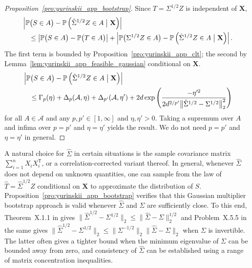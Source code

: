 \documentclass[11pt,lof]{puthesis}
\renewcommand{\P}{\ensuremath{\mathbb{P}}}
\newcommand{\bX}{\ensuremath{\mathbf{X}}}
\newcommand{\cA}{\ensuremath{\mathcal{A}}}
\newcommand{\T}{\ensuremath{\mathsf{T}}}
\theoremstyle{break}
\theoremstyle{proof}
\newtheorem{proof}{Proof}
\begin{document}
\begin{proof}[Proposition~\ref{pro:yurinskii_app_bootstrap}]

  Since $T = \Sigma^{1/2} Z$ is independent of $\bX$,
  \begin{align*}
    &\left|
    \P\big(S \in A\big)
    - \P\left(\hat \Sigma^{1/2} Z \in A \bigm| \bX\right)
    \right| \\
    &\quad\leq
    \left|
    \P\big(S \in A\big)
    - \P\big(T \in A\big)
    \right|
    +\left|
    \P\big(\Sigma^{1/2} Z \in A\big)
    - \P\left(\hat \Sigma^{1/2} Z \in A \bigm| \bX\right)
    \right|.
  \end{align*}
  The first term is bounded by Proposition~\ref{pro:yurinskii_app_clt};
  the second by Lemma~\ref{lem:yurinskii_app_feasible_gaussian}
  conditional on $\bX$.
  \begin{align*}
    &\left|
    \P\big(S \in A\big)
    - \P\left(\hat \Sigma^{1/2} Z \in A \bigm| \bX\right)
    \right| \\
    &\quad\leq
    \Gamma_p(\eta) + \Delta_p(\cA, \eta)
    + \Delta_{p'}(\cA, \eta')
    + 2 d \exp \left( \frac{-\eta'^2}
      {2 d^{2/p'} \big\|\hat\Sigma^{1/2} - \Sigma^{1/2}\big\|_2^2}
    \right)
  \end{align*}
  for all $A \in \cA$
  and any $p, p' \in [1, \infty]$ and $\eta, \eta' > 0$.
  Taking a supremum over $A$ and infima over
  $p = p'$ and $\eta = \eta'$ yields the result.
  We do not need
  $p = p'$ and $\eta = \eta'$ in general.
\end{proof}

A natural choice for $\hat\Sigma$ in certain situations is the sample
covariance matrix $\sum_{i=1}^n X_i X_i^\T$, or a correlation-corrected variant
thereof. In general, whenever $\hat \Sigma$ does not depend on unknown
quantities, one can sample from the law of $\hat T = \hat\Sigma^{1/2} Z$
conditional on $\bX$ to approximate the distribution of $S$.
Proposition~\ref{pro:yurinskii_app_bootstrap} verifies that this Gaussian
multiplier bootstrap approach is valid whenever $\hat\Sigma$ and $\Sigma$ are
sufficiently close. To this end, Theorem~X.1.1 in \citet{bhatia1997matrix} gives
$\big\|\hat\Sigma^{1/2} - \Sigma^{1/2}\big\|_2
\leq \big\|\hat\Sigma - \Sigma\big\|_2^{1/2}$
and Problem~X.5.5 in the same gives
$\big\|\hat\Sigma^{1/2} - \Sigma^{1/2}\big\|_2
\leq \big\|\Sigma^{-1/2}\big\|_2 \big\|\hat\Sigma - \Sigma\big\|_2$
when $\Sigma$ is invertible. The latter often gives a tighter bound when the
minimum eigenvalue of $\Sigma$ can be bounded away from zero, and consistency
of $\hat \Sigma$ can be established using a range of matrix concentration
inequalities.
\end{document}
